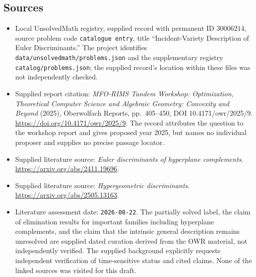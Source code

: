 \documentclass[11pt]{article}
\begin{document}
\subsection{Sources}
\begin{itemize}
\item Local UnsolvedMath registry, supplied record with permanent ID \(30006214\), source problem code \texttt{catalogue entry}, title ``Incident-Variety Description of Euler Discriminants.'' The project identifies \texttt{data/unsolvedmath/problems.json} and the supplementary registry \texttt{catalog/problems.json}; the supplied record's location within these files was not independently checked.
\item Supplied report citation: \emph{MFO-RIMS Tandem Workshop: Optimization, Theoretical Computer Science and Algebraic Geometry: Convexity and Beyond} (2025), Oberwolfach Reports, pp.\ 405--450, DOI 10.4171/owr/2025/9. \url{https://doi.org/10.4171/owr/2025/9}. The record attributes the question to the workshop report and gives proposed year 2025, but names no individual proposer and supplies no precise passage locator.
\item Supplied literature source: \emph{Euler discriminants of hyperplane complements}. \url{https://arxiv.org/abs/2411.19696}.
\item Supplied literature source: \emph{Hypergeometric discriminants}. \url{https://arxiv.org/abs/2505.13163}.
\item Literature assessment date: \texttt{2026-08-22}. The partially solved label, the claim of elimination results for important families including hyperplane complements, and the claim that the intrinsic general description remains unresolved are supplied dated curation derived from the OWR material, not independently verified. The supplied background explicitly requests independent verification of time-sensitive status and cited claims. None of the linked sources was visited for this draft.
\end{itemize}
\end{document}
